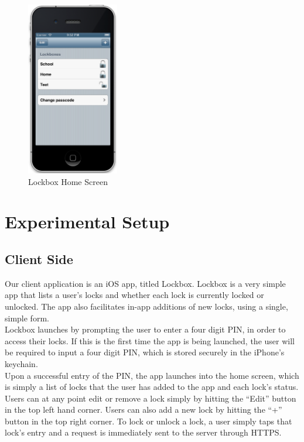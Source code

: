 \documentclass[10pt]{article}
\begin{document}
\begin{multicols}{2}
\begin{figure}[H]
\centering
\includegraphics[height=3in]{ios.png}
\caption{Lockbox Home Screen}
\end{figure}

\section{Experimental Setup}

\subsection{Client Side}

Our client application is an iOS app, titled Lockbox. Lockbox is a very simple app that lists a user's locks and whether each lock is currently locked or unlocked. The app also facilitates in-app additions of new locks, using a single, simple form. \\

Lockbox launches by prompting the user to enter a four digit PIN, in order to access their locks. If this is the first time the app is being launched, the user will be required to input a four digit PIN, which is stored securely in the iPhone's keychain. \\

Upon a successful entry of the PIN, the app launches into the home screen, which is simply a list of locks that the user has added to the app and each lock's status. Users can at any point edit or remove a lock simply by hitting the ``Edit'' button in the top left hand corner. Users can also add a new lock by hitting the ``+'' button in the top right corner. To lock or unlock a lock, a user simply taps that lock's entry and a request is immediately sent to the server through HTTPS. \\


\end{multicols}
\end{document}
